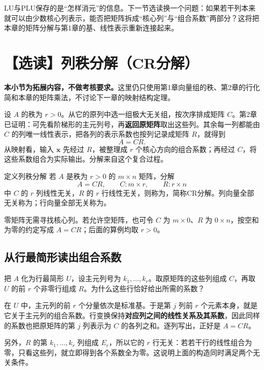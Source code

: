 \documentclass[a4paper,12pt,twoside,openany,fontset=none]{ctexbook}
\newcounter{definition}[chapter]
\newenvironment{definition}[1][]{\begin{defBox}{定义}{#1}}{\end{defBox}}
\numberwithin{equation}{chapter}
\begin{document}
LU与PLU保存的是“怎样消元”的信息。下一节选读换一个问题：如果若干列本来就可以由少数核心列表示，能否把矩阵拆成“核心列”与“组合系数”两部分？这将把本章的矩阵分解与第1章的基、线性表示重新连接起来。

\section{【选读】列秩分解（CR分解）}
\label{sec:three-cr}

\textbf{本小节为拓展内容，不做考核要求。}这里仍只使用第1章向量组的秩、第2章的行化简和本章的矩阵乘法，不讨论下一章的映射结构定理。

设 $A$ 的秩为 $r>0$。从它的原列中选一组极大无关组，按次序排成矩阵 $C$。第2章已证明：可先看阶梯形的主元列号，再\textbf{返回原矩阵}取出这些列。其余每一列都能由 $C$ 的列唯一线性表示，把各列的表示系数也按列记录成矩阵 $R$，就得到
\[
 A=CR.
\]
从映射看，输入 $\boldsymbol x$ 先经过 $R$，被整理成 $r$ 个核心方向的组合系数；再经过 $C$，将这些系数组合为实际输出。分解来自这个复合过程。

\begin{definition}[列秩分解]
若 $A$ 是秩为 $r>0$ 的 $m\times n$ 矩阵，分解
\[
 \boxed{A=CR,\qquad C:m\times r,\qquad R:r\times n}
\]
中 $C$ 的 $r$ 列线性无关，$R$ 的 $r$ 行线性无关，则称为，简称CR分解。列向量全部无关称为；行向量全部无关称为。
\end{definition}

零矩阵无需寻找核心列。若允许空矩阵，也可令 $C$ 为 $m\times0$、$R$ 为 $0\times n$，按空和为零的约定写成 $A=CR$；后面的算例均取 $r>0$。

\subsection*{从行最简形读出组合系数}

把 $A$ 化为行最简形 $U$，设主元列号为 $k_1,\ldots,k_r$。取原矩阵的这些列组成 $C$，再取 $U$ 的前 $r$ 个非零行组成 $R$。为什么这些行恰好给出所需的系数？

在 $U$ 中，主元列的前 $r$ 个分量依次是标准基。于是第 $j$ 列前 $r$ 个元素本身，就是它关于主元列的组合系数。行变换保持\textbf{对应列之间的线性关系及其系数}，因此同样的系数也把原矩阵的第 $j$ 列表示为 $C$ 的各列之和。逐列写出，正好是 $A=CR$。

另外，$R$ 的第 $k_1,\ldots,k_r$ 列组成 $E_r$，所以它的 $r$ 行无关：若若干行的线性组合为零，只看这些列，就立即得到各个系数全为零。这说明上面的构造同时满足两个无关条件。
\end{document}
